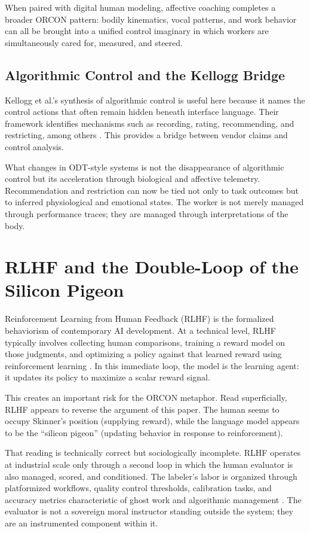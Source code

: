 \documentclass[runningheads]{llncs}
\begin{document}
When paired with digital human modeling, affective coaching completes a broader ORCON pattern: bodily kinematics, vocal patterns, and work behavior can all be brought into a unified control imaginary in which workers are simultaneously cared for, measured, and steered.

\subsection{Algorithmic Control and the Kellogg Bridge}

Kellogg et al.'s synthesis of algorithmic control is useful here because it names the control actions that often remain hidden beneath interface language. Their framework identifies mechanisms such as recording, rating, recommending, and restricting, among others \cite{kellogg2020algorithms}. This provides a bridge between vendor claims and control analysis.

What changes in ODT-style systems is not the disappearance of algorithmic control but its acceleration through biological and affective telemetry. Recommendation and restriction can now be tied not only to task outcomes but to inferred physiological and emotional states. The worker is not merely managed through performance traces; they are managed through interpretations of the body.

\section{RLHF and the Double-Loop of the Silicon Pigeon}

Reinforcement Learning from Human Feedback (RLHF) is the formalized behaviorism of contemporary AI development. At a technical level, RLHF typically involves collecting human comparisons, training a reward model on those judgments, and optimizing a policy against that learned reward using reinforcement learning \cite{christiano2017preferences,ouyang2022training,sutton2018reinforcement}. In this immediate loop, the model is the learning agent: it updates its policy to maximize a scalar reward signal.

This creates an important risk for the ORCON metaphor. Read superficially, RLHF appears to reverse the argument of this paper. The human seems to occupy Skinner's position (supplying reward), while the language model appears to be the ``silicon pigeon'' (updating behavior in response to reinforcement).

That reading is technically correct but sociologically incomplete. RLHF operates at industrial scale only through a second loop in which the human evaluator is also managed, scored, and conditioned. The labeler's labor is organized through platformized workflows, quality control thresholds, calibration tasks, and accuracy metrics characteristic of ghost work and algorithmic management \cite{gray2019ghost,kellogg2020algorithms}. The evaluator is not a sovereign moral instructor standing outside the system; they are an instrumented component within it.
\end{document}
